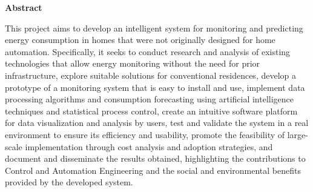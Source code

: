 
\begin{center}
\huge{{\bf Abstract}}
\vspace{2cm}
\end{center}

This project aims to develop an intelligent system for monitoring and predicting energy consumption in homes that were not originally designed for home automation. Specifically, it seeks to conduct research and analysis of existing technologies that allow energy monitoring without the need for prior infrastructure, explore suitable solutions for conventional residences, develop a prototype of a monitoring system that is easy to install and use, implement data processing algorithms and consumption forecasting using artificial intelligence techniques and statistical process control, create an intuitive software platform for data visualization and analysis by users, test and validate the system in a real environment to ensure its efficiency and usability, promote the feasibility of large-scale implementation through cost analysis and adoption strategies, and document and disseminate the results obtained, highlighting the contributions to Control and Automation Engineering and the social and environmental benefits provided by the developed system.
\clearpage
\thispagestyle{empty}
\cleardoublepage


